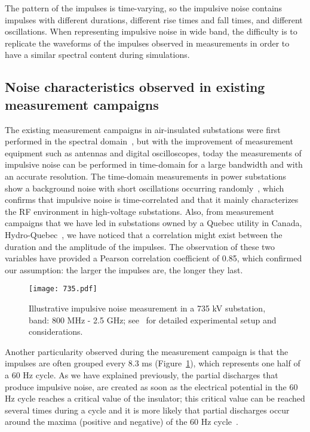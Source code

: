 \documentclass[journal]{IEEEtran}
\begin{document}
The pattern of the impulses is time-varying, so the impulsive noise contains impulses with different durations, different rise times and fall times, and different oscillations. When representing impulsive noise in wide band, the difficulty is to replicate the waveforms of the impulses observed in measurements in order to have a similar spectral content during simulations.
\subsection{Noise characteristics observed in existing measurement campaigns}
The existing measurement campaigns in air-insulated substations were first performed in the spectral domain~\cite{pakala1,pakala2}, but with the improvement of measurement equipment such as antennas and digital oscilloscopes, today the measurements of impulsive noise can be performed in time-domain for a large bandwidth and with an accurate resolution. The time-domain measurements in power substations show a background noise with short oscillations occurring randomly~\cite{moore2}, which confirms that impulsive noise is time-correlated and that it mainly characterizes the RF environment in high-voltage substations. Also, from measurement campaigns that we have led in substations owned by a Quebec utility in Canada, Hydro-Quebec~\cite{taiwan,cigre}, we have noticed that a correlation might exist between the duration and the amplitude of the impulses. The observation of these two variables have provided a Pearson correlation coefficient of 0.85, which confirmed our assumption: the larger the impulses are, the longer they last.
\begin{figure}[h]
\texttt{[image: 735.pdf]}\\
  \caption{Illustrative impulsive noise measurement in a 735 kV substation, band: 800 MHz - 2.5 GHz; see~\cite{taiwan,cigre} for detailed experimental setup and considerations.}\label{735}
\end{figure}
Another particularity observed during the measurement campaign is that the impulses are often grouped every 8.3 ms (Figure~\ref{735}), which represents one half of a 60 Hz cycle. As we have explained previously, the partial discharges that produce impulsive noise, are created as soon as the electrical potential in the 60 Hz cycle reaches a critical value of the insulator; this critical value can be reached several times during a cycle and it is more likely that partial discharges occur around the maxima (positive and negative) of the 60 Hz cycle~\cite{bart}.\
\end{document}
